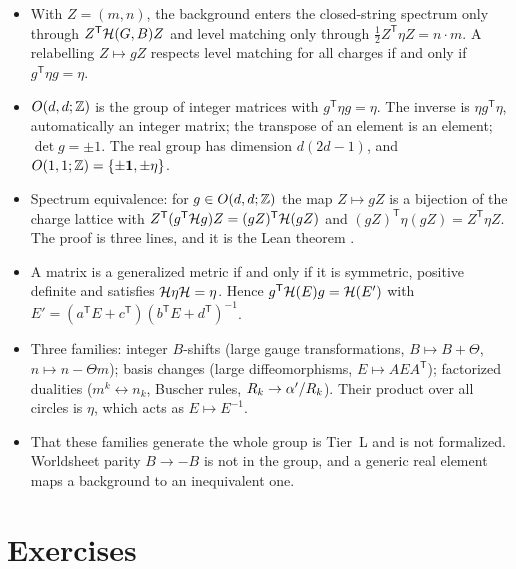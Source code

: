 \begin{summarybox}
\begin{itemize}[leftmargin=*,itemsep=1pt]
\item With $Z=(m,n)$, the background enters the closed-string spectrum only through
 $Z^{\mathsf T}\mathcal{H}(G,B)Z$ and level matching only through $\frac12Z^{\mathsf T}\eta Z
 =n\cdot m$. A relabelling $Z\mapsto gZ$ respects level matching for all charges if and
 only if $g^{\mathsf T}\eta g=\eta$.
\item $O(d,d;\mathbb{Z})$ is the group of integer matrices with $g^{\mathsf T}\eta g=\eta$. The
 inverse is $\eta g^{\mathsf T}\eta$, automatically an integer matrix; the transpose of an
 element is an element; $\det g=\pm1$. The real group has dimension $d(2d-1)$, and
 $O(1,1;\mathbb{Z})=\{\pm\mathbf 1,\pm\eta\}$.
\item Spectrum equivalence: for $g\in O(d,d;\mathbb{Z})$ the map $Z\mapsto gZ$ is a bijection of the
 charge lattice with $Z^{\mathsf T}(g^{\mathsf T}\mathcal{H} g)Z=(gZ)^{\mathsf T}\mathcal{H}(gZ)$ and
 $(gZ)^{\mathsf T}\eta(gZ)=Z^{\mathsf T}\eta Z$. The proof is three lines, and it is the
 Lean theorem .
\item A matrix is a generalized metric if and only if it is symmetric, positive definite and
 satisfies $\mathcal{H}\eta\mathcal{H}=\eta$. Hence $g^{\mathsf T}\mathcal{H}(E)g=\mathcal{H}(E')$ with
 $E'=(a^{\mathsf T}E+c^{\mathsf T})(b^{\mathsf T}E+d^{\mathsf T})^{-1}$.
\item Three families: integer $B$-shifts (large gauge transformations, $B\mapsto B+\Theta$,
 $n\mapsto n-\Theta m$); basis changes (large diffeomorphisms, $E\mapsto AEA^{\mathsf T}$);
 factorized dualities ($m^k\leftrightarrow n_k$, Buscher rules, $R_k\to\alpha'/R_k$). Their
 product over all circles is $\eta$, which acts as $E\mapsto E^{-1}$.
\item That these families generate the whole group is Tier~L and is not formalized.
 Worldsheet parity $B\to-B$ is not in the group, and a generic real element maps a
 background to an inequivalent one.
\end{itemize}
\end{summarybox}

\section*{Exercises}

